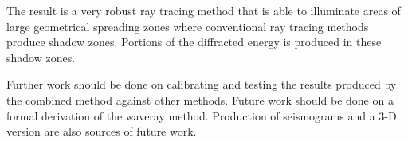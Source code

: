 The result is a very robust ray tracing method that is able to 
illuminate areas of large geometrical spreading zones where
conventional ray tracing methods produce shadow zones. Portions
of the diffracted energy is produced in these shadow zones.

Further work should be done on calibrating and testing the results produced
by the combined method against other methods. Future work
should be done on a formal derivation of the waveray method.
Production of seismograms and a {\mbox 3-D} version are also
sources of future work.







